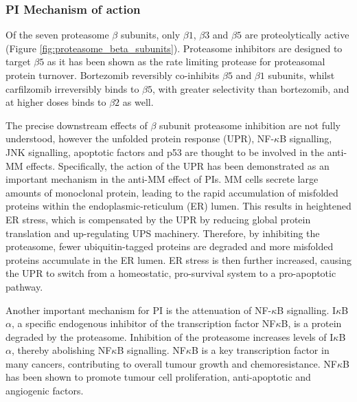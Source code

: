 \subsubsection{PI Mechanism of action}
Of the seven proteasome $\beta$ subunits, only $\beta1$, $\beta3$ and $\beta5$ are proteolytically active (Figure \ref{fig:proteasome_beta_subunits}). Proteasome inhibitors are designed to target $\beta5$ as it has been shown as the rate limiting protease for proteasomal protein turnover\cite{besse2019proteasome}. Bortezomib reversibly co-inhibits $\beta5$ and $\beta1$ subunits, whilst carfilzomib irreversibly binds to $\beta5$, with greater selectivity than bortezomib, and at higher doses binds to $\beta2$ as well\cite{besse2019proteasome}.

The precise downstream effects of $\beta$ subunit proteasome inhibition are not fully understood, however the unfolded protein response (UPR), NF-$\kappa$B signalling, JNK signalling, apoptotic factors and p53 are thought to be involved in the anti-MM effects\cite{kubiczkova2014proteasome}.
Specifically, the action of the UPR has been demonstrated as an important mechanism in the anti-MM effect of PIs.
MM cells secrete large amounts of monoclonal protein, leading to the rapid accumulation of  misfolded proteins within the endoplasmic-reticulum (ER) lumen.
This results in heightened ER stress, which is compensated by the UPR by reducing global protein translation and up-regulating UPS machinery\cite{wallington2018resistance}.
Therefore, by inhibiting the proteasome, fewer ubiquitin-tagged proteins are degraded and more misfolded proteins accumulate in the ER lumen.
ER stress is then further increased, causing the UPR to switch from a homeostatic, pro-survival system to a pro-apoptotic pathway\cite{kubiczkova2014proteasome, wallington2018resistance}.

Another important mechanism for PI is the attenuation of NF-$\kappa$B signalling. I$\kappa$B$\alpha$, a specific endogenous inhibitor of the transcription factor NF$\kappa$B, is a protein degraded by the proteasome.
Inhibition of the proteasome increases levels of I$\kappa$B$\alpha$, thereby abolishing NF$\kappa$B signalling.
NF$\kappa$B is a key transcription factor in many cancers, contributing to overall tumour growth and chemoresistance.
NF$\kappa$B has been shown to promote tumour cell proliferation, anti-apoptotic and angiogenic factors\cite{kale2012molecular}.

